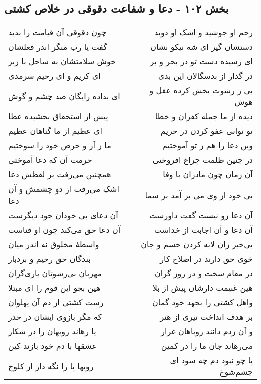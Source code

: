 \begin{center}
\section*{بخش ۱۰۲ - دعا و شفاعت دقوقی در خلاص کشتی}
\label{sec:sh102}
\begin{longtable}{l p{0.5cm} r}
چون دقوقی آن قیامت را بدید
&&
رحم او جوشید و اشک او دوید
\\
گفت یا رب منگر اندر فعلشان
&&
دستشان گیر ای شه نیکو نشان
\\
خوش سلامتشان به ساحل با زبر
&&
ای رسیده دست تو در بحر و بر
\\
ای کریم و ای رحیم سرمدی
&&
در گذار از بدسگالان این بدی
\\
ای بداده رایگان صد چشم و گوش
&&
بی ز رشوت بخش کرده عقل و هوش
\\
پیش از استحقاق بخشیده عطا
&&
دیده از ما جمله کفران و خطا
\\
ای عظیم از ما گناهان عظیم
&&
تو توانی عفو کردن در حریم
\\
ما ز آز و حرص خود را سوختیم
&&
وین دعا را هم ز تو آموختیم
\\
حرمت آن که دعا آموختی
&&
در چنین ظلمت چراغ افروختی
\\
همچنین می‌رفت بر لفظش دعا
&&
آن زمان چون مادران با وفا
\\
اشک می‌رفت از دو چشمش و آن دعا
&&
بی خود از وی می بر آمد بر سما
\\
آن دعای بی خودان خود دیگرست
&&
آن دعا زو نیست گفت داورست
\\
آن دعا حق می‌کند چون او فناست
&&
آن دعا و آن اجابت از خداست
\\
واسطهٔ مخلوق نه اندر میان
&&
بی‌خبر زان لابه کردن جسم و جان
\\
بندگان حق رحیم و بردبار
&&
خوی حق دارند در اصلاح کار
\\
مهربان بی‌رشوتان یاری‌گران
&&
در مقام سخت و در روز گران
\\
هین بجو این قوم را ای مبتلا
&&
هین غنیمت دارشان پیش از بلا
\\
رست کشتی از دم آن پهلوان
&&
واهل کشتی را بجهد خود گمان
\\
که مگر بازوی ایشان در حذر
&&
بر هدف انداخت تیری از هنر
\\
پا رهاند روبهان را در شکار
&&
و آن زدم دانند روباهان غرار
\\
عشقها با دم خود بازند کین
&&
می‌رهاند جان ما را در کمین
\\
روبها پا را نگه دار از کلوخ
&&
پا چو نبود دم چه سود ای چشم‌شوخ
\\

\end{longtable}
\end{center}
